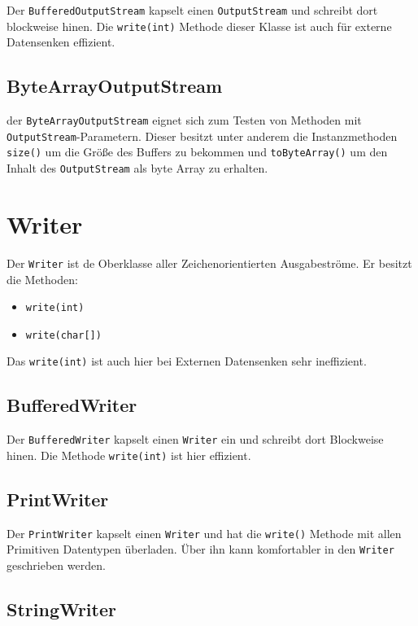 Der \lstinline{BufferedOutputStream} kapselt einen \lstinline{OutputStream} und schreibt dort
blockweise hinen. Die \lstinline{write(int)} Methode dieser Klasse ist auch für
externe Datensenken effizient.

\subsection{ByteArrayOutputStream}

der \lstinline{ByteArrayOutputStream} eignet sich zum Testen von Methoden mit
\lstinline{OutputStream}-Parametern. Dieser besitzt unter anderem 
die Instanzmethoden \lstinline{size()} um die Größe des 
Buffers zu bekommen und \lstinline{toByteArray()} um den 
Inhalt des \lstinline{OutputStream} als byte Array zu erhalten.

\section{Writer}

Der \lstinline{Writer} ist de Oberklasse aller Zeichenorientierten Ausgabeströme. 
Er besitzt die Methoden:

\begin{itemize}
    \item \lstinline{write(int)}
    \item \lstinline{write(char[])}
\end{itemize}
Das \lstinline{write(int)} ist auch hier bei Externen Datensenken 
sehr ineffizient.

\subsection{BufferedWriter}

Der \lstinline{BufferedWriter} kapselt einen \lstinline{Writer} ein und 
schreibt dort Blockweise hinen. Die Methode \lstinline{write(int)} ist 
hier effizient.

\subsection{PrintWriter}

Der \lstinline{PrintWriter} kapselt einen \lstinline{Writer} und hat 
die \lstinline{write()} Methode mit allen Primitiven Datentypen überladen.
Über ihn kann komfortabler in den \lstinline{Writer} geschrieben werden.

\subsection{StringWriter}

